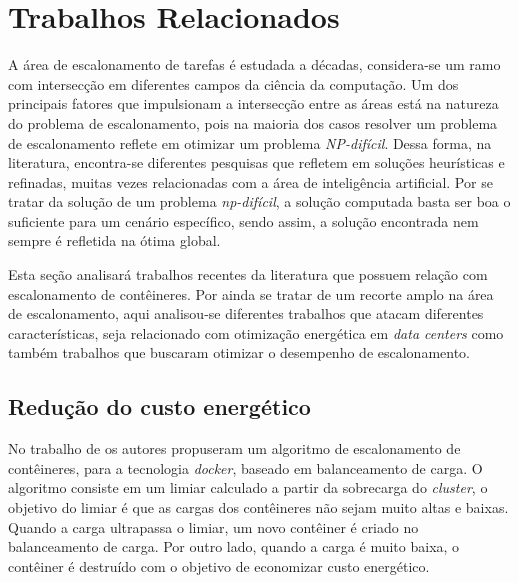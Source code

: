 \chapter{Trabalhos Relacionados}

A área de escalonamento de tarefas é estudada a décadas, considera-se um ramo com intersecção em diferentes campos da ciência da computação. Um dos principais fatores que impulsionam a intersecção entre as áreas está na natureza do problema de escalonamento, pois na maioria dos casos resolver um problema de escalonamento reflete em otimizar um problema \textit{NP-difícil}. Dessa forma, na literatura, encontra-se diferentes pesquisas que refletem em soluções heurísticas e refinadas, muitas vezes relacionadas com a área de inteligência artificial. Por se tratar da solução de um problema \textit{np-difícil}, a solução computada basta ser boa o suficiente para um cenário específico, sendo assim, a solução encontrada nem sempre é refletida na ótima global.

Esta seção analisará trabalhos recentes da literatura que possuem relação com escalonamento de contêineres. Por ainda se tratar de um recorte amplo na área de escalonamento, aqui analisou-se diferentes trabalhos que atacam diferentes características, seja relacionado com otimização energética em \textit{data centers} como também trabalhos que buscaram otimizar o desempenho de escalonamento.

\section{Redução do custo energético}
No trabalho de  os autores propuseram um algoritmo de escalonamento de contêineres, para a tecnologia \textit{docker}, baseado em balanceamento de carga. O algoritmo consiste em um limiar calculado a partir da sobrecarga do \textit{cluster}, o objetivo do limiar é que as cargas dos contêineres não sejam muito altas e baixas. Quando a carga ultrapassa o limiar, um novo contêiner é criado no balanceamento de carga. Por outro lado, quando a carga é muito baixa, o contêiner é destruído com o objetivo de economizar custo energético.

